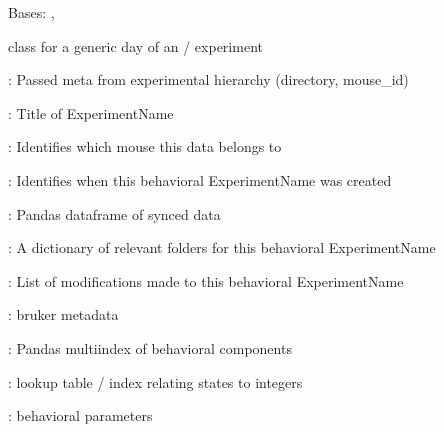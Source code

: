 \documentclass[letterpaper,10pt,english]{sphinxmanual}
\begin{document}
\begin{fulllineitems}
\label{\detokenize{Organization:Organization.ImagingBehaviorExperiment}}
\pysigstartsignatures
{}
\pysigstopsignatures
\sphinxAtStartPar
Bases: {\hyperref[\detokenize{Organization:Organization.ImagingExperiment}]{}}, {\hyperref[\detokenize{Organization:Organization.BehavioralExperiment}]{}}

\sphinxAtStartPar
{} class for a generic day of an
 /
 experiment
\begin{description}
\begin{DUlineblock}{0em}
\item[]  : Passed meta from experimental hierarchy (directory, mouse\_id)
\item[]  : Title of ExperimentName
\end{DUlineblock}

\begin{DUlineblock}{0em}
\item[]  : Identifies which mouse this data belongs to
\item[]  : Identifies when this behavioral ExperimentName was created
\end{DUlineblock}

\begin{DUlineblock}{0em}
\item[]  : Pandas dataframe of synced data
\item[]  : A dictionary of relevant folders for this behavioral ExperimentName
\item[]  : List of modifications made to this behavioral ExperimentName
\item[]  : bruker metadata
\item[] : Pandas multi\sphinxhyphen{}index of behavioral components
\item[]  : look\sphinxhyphen{}up table / index relating states to integers
\item[]  : behavioral parameters
\end{DUlineblock}


\end{description}
\end{fulllineitems}
\end{document}
